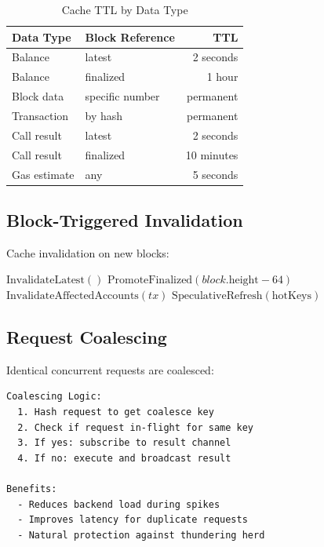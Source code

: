 \documentclass[11pt,a4paper]{article}
\begin{document}
\begin{table}[htbp]
\centering
\caption{Cache TTL by Data Type}
\begin{tabular}{llr}
\toprule
\textbf{Data Type} & \textbf{Block Reference} & \textbf{TTL} \\
\midrule
Balance & latest & 2 seconds \\
Balance & finalized & 1 hour \\
Block data & specific number & permanent \\
Transaction & by hash & permanent \\
Call result & latest & 2 seconds \\
Call result & finalized & 10 minutes \\
Gas estimate & any & 5 seconds \\
\bottomrule
\end{tabular}
\label{tab:ttl}
\end{table}

\subsection{Block-Triggered Invalidation}

Cache invalidation on new blocks:

\begin{algorithm}
\caption{Block-Triggered Cache Invalidation}
\begin{algorithmic}[1]
    \State $\text{InvalidateLatest}()$ 
        \State $\text{PromoteFinalized}(block.\text{height} - 64)$
    \EndIf
        \State $\text{InvalidateAffectedAccounts}(tx)$
    \EndFor
    \State $\text{SpeculativeRefresh}(\text{hotKeys})$
\EndProcedure
\end{algorithmic}
\end{algorithm}

\subsection{Request Coalescing}

Identical concurrent requests are coalesced:

\begin{lstlisting}
Coalescing Logic:
  1. Hash request to get coalesce key
  2. Check if request in-flight for same key
  3. If yes: subscribe to result channel
  4. If no: execute and broadcast result

Benefits:
  - Reduces backend load during spikes
  - Improves latency for duplicate requests
  - Natural protection against thundering herd
\end{lstlisting}
\end{document}
